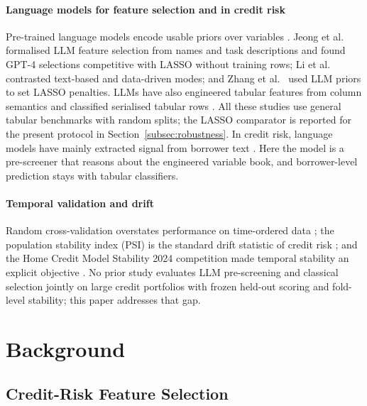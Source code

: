 \documentclass[final,5p,twocolumn]{elsarticle}
\begin{document}
\paragraph{Language models for feature selection and in credit risk}
Pre-trained language models encode usable priors over variables \cite{choi2022}. Jeong et al.\ \cite{jeong2025} formalised LLM feature selection from names and task descriptions and found GPT-4 selections competitive with LASSO without training rows; Li et al.\ \cite{li2025sigkdd} contrasted text-based and data-driven modes; and Zhang et al.\ \cite{zhang2025llmlasso} used LLM priors to set LASSO penalties. LLMs have also engineered tabular features from column semantics \cite{hollmann2023caafe,han2024llmfe,nam2024octree} and classified serialised tabular rows \cite{hegselmann2023tabllm}. All these studies use general tabular benchmarks with random splits; the LASSO comparator is reported for the present protocol in Section~\ref{subsec:robustness}. In credit risk, language models have mainly extracted signal from borrower text \cite{sanzguerrero2025,xia2025}. Here the model is a pre-screener that reasons about the engineered variable book, and borrower-level prediction stays with tabular classifiers.

\paragraph{Temporal validation and drift}
Random cross-validation overstates performance on time-ordered data \cite{bergmeir2012,gama2014}; the population stability index (PSI) is the standard drift statistic of credit risk \cite{yurdakul2020}; and the Home Credit Model Stability 2024 competition made temporal stability an explicit objective \cite{homecredit2024}. No prior study evaluates LLM pre-screening and classical selection jointly on large credit portfolios with frozen held-out scoring and fold-level stability; this paper addresses that gap.


\section{Background}
\label{sec:background}

\subsection{Credit-Risk Feature Selection}
\label{subsec:credit_risk_fs}
\end{document}
